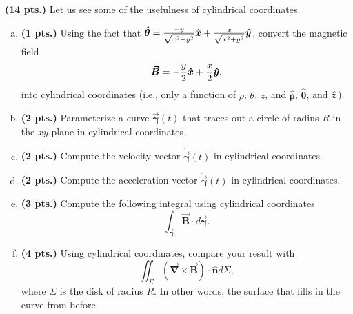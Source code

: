 \documentclass[12pt]{article} %
\newcommand{\grad}{\boldsymbol{\vec{\nabla}}}
\newcommand{\curvegamma}{\boldsymbol{\vec{\gamma}}}
\newcommand{\tangentgamma}{\boldsymbol{\dot{\vec{\gamma}}}}
\newcommand{\normalgamma}{\boldsymbol{\ddot{\vec{\gamma}}}}
\newcommand{\thetahat}{\boldsymbol{\hat{\theta}}}
\newcommand{\rhohat}{\boldsymbol{\hat{\rho}}}
\newcommand{\unitvec}{\boldsymbol{\hat{n}}}
\newcommand{\vecfieldB}{\boldsymbol{\vec{B}}}
\begin{document}
\newpage
\begin{problem}
	\textbf{(14 pts.)} Let us see some of the usefulness of cylindrical coordinates.
	\begin{enumerate}[(a)]
		\item \textbf{(1 pts.)} Using the fact that $\thetahat = \frac{-y}{\sqrt{x^2+y^2}}\xhat + \frac{x}{\sqrt{x^2+y^2}}\yhat$, convert the magnetic field 
		\[
		\vecfieldB = -\frac{y}{2}\xhat + \frac{x}{2}\yhat,
		\]
		into cylindrical coordinates (i.e., only a function of $\rho$, $\theta$, $z$, and $\rhohat$, $\thetahat$, and $\boldsymbol{\hat{z}}$).  
		\item \textbf{(2 pts.)} Parameterize a curve $\curvegamma(t)$ that traces out a circle of radius $R$ in the $xy$-plane in cylindrical coordinates.
		\item \textbf{(2 pts.)} Compute the velocity vector $\tangentgamma(t)$ in cylindrical coordinates.
		\item \textbf{(2 pts.)} Compute the acceleration vector $\normalgamma(t)$ in cylindrical coordinates.
		\item \textbf{(3 pts.)} Compute the following integral using cylindrical coordinates
		\[
		\int_{\curvegamma} \vecfieldB \cdot d\curvegamma.
		\]
		        \item \textbf{(4 pts.)} Using cylindrical coordinates, compare your result with
		        \[
		        \iint_\Sigma \left(\grad \times \vecfieldB\right) \cdot \unitvec d\Sigma,
		        \]
		        where $\Sigma$ is the disk of radius $R$. In other words, the surface that fills in the curve from before.
	\end{enumerate}
\end{problem}
\end{document}
